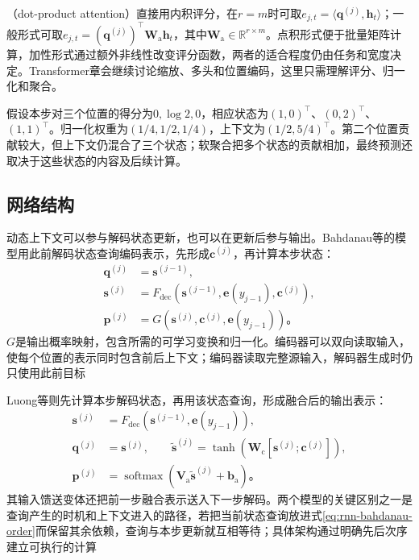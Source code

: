 （dot-product attention）直接用内积评分，在$r=m$时可取$e_{j,t}=\langle\bm{q}^{(j)},\bm{h}_t\rangle$；一般形式可取$e_{j,t}=(\bm{q}^{(j)})^{\top}\bm{W}_{\mathrm{a}}\bm{h}_t$，其中$\bm{W}_{\mathrm{a}}\in\mathbb{R}^{r\times m}$。点积形式便于批量矩阵计算，加性形式通过额外非线性改变评分函数，两者的适合程度仍由任务和宽度决定。Transformer章会继续讨论缩放、多头和位置编码，这里只需理解评分、归一化和聚合。

\begin{example}[权重与上下文]
  \label{ex:rnn-attention-context}
  假设本步对三个位置的得分为$0,\log2,0$，相应状态为$(1,0)^{\top}$、$(0,2)^{\top}$、$(1,1)^{\top}$。归一化权重为$(1/4,1/2,1/4)$，上下文为$(1/2,5/4)^{\top}$。第二个位置贡献较大，但上下文仍混合了三个状态；软聚合把多个状态的贡献相加，最终预测还取决于这些状态的内容及后续计算。
\end{example}

\subsection{网络结构}
\label{sec:rnn-attentive-architecture}

动态上下文可以参与解码状态更新，也可以在更新后参与输出。Bahdanau等的模型用此前解码状态查询编码表示，先形成$\bm{c}^{(j)}$，再计算本步状态：
\begin{equation}
  \begin{aligned}
    \bm{q}^{(j)}&=\bm{s}^{(j-1)},\\
    \bm{s}^{(j)}&=F_{\mathrm{dec}}\!\left(
      \bm{s}^{(j-1)},\bm{e}(y_{j-1}),\bm{c}^{(j)}\right),\\
    \bm{p}^{(j)}&=G\!\left(\bm{s}^{(j)},\bm{c}^{(j)},\bm{e}(y_{j-1})\right)\text{。}
  \end{aligned}
  \label{eq:rnn-bahdanau-order}
\end{equation}
$G$是输出概率映射，包含所需的可学习变换和归一化。编码器可以双向读取输入，使每个位置的表示同时包含前后上下文；编码器读取完整源输入，解码器生成时仍只使用此前目标

Luong等则先计算本步解码状态，再用该状态查询，形成融合后的输出表示：
\begin{equation}
  \begin{aligned}
    \bm{s}^{(j)}&=F_{\mathrm{dec}}\!\left(
      \bm{s}^{(j-1)},\bm{e}(y_{j-1})\right),\\
    \bm{q}^{(j)}&=\bm{s}^{(j)},\qquad
    \widetilde{\bm{s}}^{(j)}=
       \tanh\!\left(\bm{W}_{\mathrm{c}}[\bm{s}^{(j)};\bm{c}^{(j)}]\right),\\
    \bm{p}^{(j)}&=\operatorname{softmax}\!\left(
      \bm{V}_{\mathrm{a}}\widetilde{\bm{s}}^{(j)}+\bm{b}_{\mathrm{a}}\right)\text{。}
  \end{aligned}
  \label{eq:rnn-luong-order}
\end{equation}
其输入馈送变体还把前一步融合表示送入下一步解码。两个模型的关键区别之一是查询产生的时机和上下文进入的路径，若把当前状态查询放进式\eqref{eq:rnn-bahdanau-order}而保留其余依赖，查询与本步更新就互相等待；具体架构通过明确先后次序建立可执行的计算

